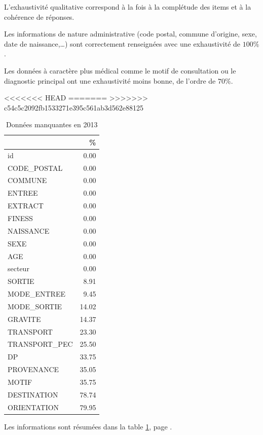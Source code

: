 \documentclass[12pt,english,french,twoside]{book}\usepackage[]{graphicx}\usepackage[]{color}
\begin{document}
L'exhaustivité qualitative correspond à la fois à la complétude des items et à la cohérence de réponses.

Les informations de nature administrative (code postal, commune d'origine, sexe, date de naissance,\dots ) sont correctement renseignées avec une exhaustivité de $100\%$.

Les données à caractère plus médical comme le motif de consultation ou le diagnostic principal ont une exhaustivité moins bonne, de l'ordre de $70\%$.

<<<<<<< HEAD
=======
>>>>>>> c54c5c2092fb1533271e395c561ab3d562e88125
\begin{table}[ht]
\centering
\begin{tabular}{|l|r|}
  \hline
 & \% \\ 
  \hline
id & 0.00 \\ 
  CODE\_POSTAL & 0.00 \\ 
  COMMUNE & 0.00 \\ 
  ENTREE & 0.00 \\ 
  EXTRACT & 0.00 \\ 
  FINESS & 0.00 \\ 
  NAISSANCE & 0.00 \\ 
  SEXE & 0.00 \\ 
  AGE & 0.00 \\ 
  secteur & 0.00 \\ 
  SORTIE & 8.91 \\ 
  MODE\_ENTREE & 9.45 \\ 
  MODE\_SORTIE & 14.02 \\ 
  GRAVITE & 14.37 \\ 
  TRANSPORT & 23.30 \\ 
  TRANSPORT\_PEC & 25.50 \\ 
  DP & 33.75 \\ 
  PROVENANCE & 35.05 \\ 
  MOTIF & 35.75 \\ 
  DESTINATION & 78.74 \\ 
  ORIENTATION & 79.95 \\ 
   \hline
\end{tabular}
\caption{Données manquantes en 2013} 
\label{tab2}
\end{table}



Les informations sont résumées dans la table \ref{tab2}, page \pageref{tab2}.
\end{document}
